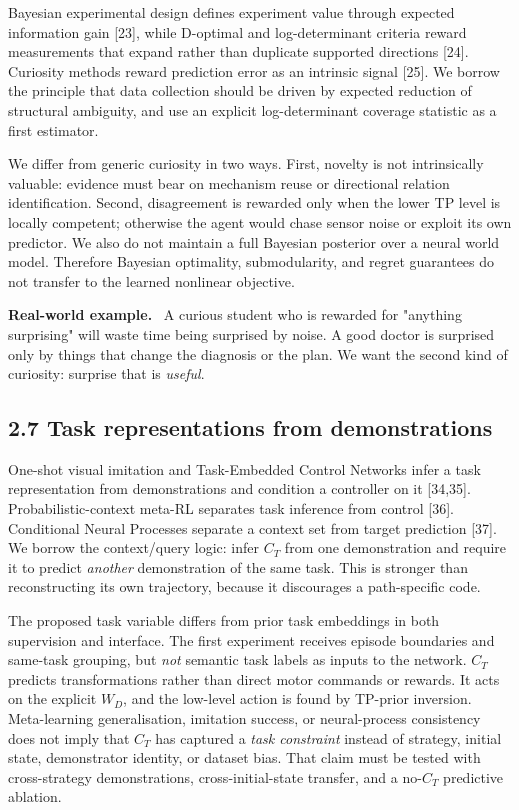 \documentclass[11pt]{article}
\newenvironment{example}{%
  \par\smallskip\noindent\begin{minipage}{\textwidth}%
  \color{teal!60!black}\small
  \textbf{\color{teal!70!black}Real-world example.}\
}{%
  \end{minipage}\par\smallskip}
\begin{document}
Bayesian experimental design defines experiment value through expected information gain [23], while D-optimal and log-determinant
criteria reward measurements that expand rather than duplicate supported directions [24]. Curiosity methods reward prediction error
as an intrinsic signal [25]. We borrow the principle that data collection should be driven by expected reduction of structural
ambiguity, and use an explicit log-determinant coverage statistic as a first estimator.

We differ from generic curiosity in two ways. First, novelty is not intrinsically valuable: evidence must bear on mechanism reuse
or directional relation identification. Second, disagreement is rewarded only when the lower TP level is locally competent;
otherwise the agent would chase sensor noise or exploit its own predictor. We also do not maintain a full Bayesian posterior over a
neural world model. Therefore Bayesian optimality, submodularity, and regret guarantees do not transfer to the learned nonlinear
objective.

\begin{example}
A curious student who is rewarded for "anything surprising" will waste time being surprised by noise. A good doctor is surprised
only by things that change the diagnosis or the plan. We want the second kind of curiosity: surprise that is \emph{useful}.
\end{example}

\subsection*{2.7 Task representations from demonstrations}

One-shot visual imitation and Task-Embedded Control Networks infer a task representation from demonstrations and condition a
controller on it [34,35]. Probabilistic-context meta-RL separates task inference from control [36]. Conditional Neural Processes
separate a context set from target prediction [37]. We borrow the context/query logic: infer $C_T$ from one demonstration and
require it to predict \emph{another} demonstration of the same task. This is stronger than reconstructing its own trajectory,
because it discourages a path-specific code.

The proposed task variable differs from prior task embeddings in both supervision and interface. The first experiment receives
episode boundaries and same-task grouping, but \emph{not} semantic task labels as inputs to the network. $C_T$ predicts
transformations rather than direct motor commands or rewards. It acts on the explicit $W_D$, and the low-level action is found by
TP-prior inversion. Meta-learning generalisation, imitation success, or neural-process consistency does not imply that $C_T$ has
captured a \emph{task constraint} instead of strategy, initial state, demonstrator identity, or dataset bias. That claim must be
tested with cross-strategy demonstrations, cross-initial-state transfer, and a no-$C_T$ predictive ablation.
\end{document}
